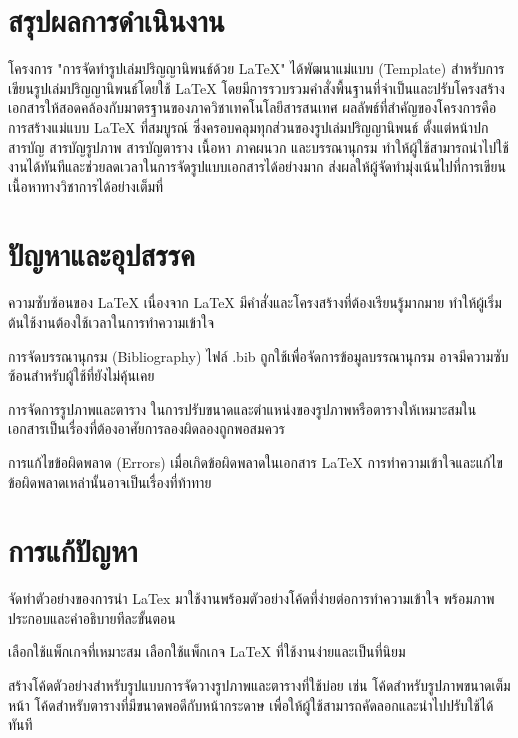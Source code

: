 
\section{สรุปผลการดำเนินงาน}
\hspace*{1.5em}
โครงการ "การจัดทำรูปเล่มปริญญานิพนธ์ด้วย LaTeX" ได้พัฒนาแม่แบบ (Template) สำหรับการเขียนรูปเล่มปริญญานิพนธ์โดยใช้ LaTeX โดยมีการรวบรวมคำสั่งพื้นฐานที่จำเป็นและปรับโครงสร้างเอกสารให้สอดคล้องกับมาตรฐานของภาควิชาเทคโนโลยีสารสนเทศ ผลลัพธ์ที่สำคัญของโครงการคือการสร้างแม่แบบ LaTeX ที่สมบูรณ์ ซึ่งครอบคลุมทุกส่วนของรูปเล่มปริญญานิพนธ์ ตั้งแต่หน้าปก สารบัญ สารบัญรูปภาพ สารบัญตาราง เนื้อหา ภาคผนวก และบรรณานุกรม ทำให้ผู้ใช้สามารถนำไปใช้งานได้ทันทีและช่วยลดเวลาในการจัดรูปแบบเอกสารได้อย่างมาก ส่งผลให้ผู้จัดทำมุ่งเน้นไปที่การเขียนเนื้อหาทางวิชาการได้อย่างเต็มที่

\section{ปัญหาและอุปสรรค}
\begin{mycustomenum}[label=5.2.\arabic*] 
    \item ความซับซ้อนของ LaTeX เนื่องจาก LaTeX มีคำสั่งและโครงสร้างที่ต้องเรียนรู้มากมาย ทำให้ผู้เริ่มต้นใช้งานต้องใช้เวลาในการทำความเข้าใจ
    \item การจัดบรรณานุกรม (Bibliography) ไฟล์ .bib ถูกใช้เพื่อจัดการข้อมูลบรรณานุกรม อาจมีความซับซ้อนสำหรับผู้ใช้ที่ยังไม่คุ้นเคย
    \item การจัดการรูปภาพและตาราง ในการปรับขนาดและตำแหน่งของรูปภาพหรือตารางให้เหมาะสมในเอกสารเป็นเรื่องที่ต้องอาศัยการลองผิดลองถูกพอสมควร
    \item การแก้ไขข้อผิดพลาด (Errors) เมื่อเกิดข้อผิดพลาดในเอกสาร LaTeX การทำความเข้าใจและแก้ไขข้อผิดพลาดเหล่านั้นอาจเป็นเรื่องที่ท้าทาย
\end{mycustomenum}

\section{การแก้ปัญหา}
\begin{mycustomenum}[label=5.3.\arabic*] 
    \item จัดทำตัวอย่างของการนำ LaTex มาใช้งานพร้อมตัวอย่างโค้ดที่ง่ายต่อการทำความเข้าใจ พร้อมภาพประกอบและคำอธิบายทีละขั้นตอน
    \item เลือกใช้แพ็กเกจที่เหมาะสม เลือกใช้แพ็กเกจ LaTeX ที่ใช้งานง่ายและเป็นที่นิยม 
    \item สร้างโค้ดตัวอย่างสำหรับรูปแบบการจัดวางรูปภาพและตารางที่ใช้บ่อย เช่น โค้ดสำหรับรูปภาพขนาดเต็มหน้า โค้ดสำหรับตารางที่มีขนาดพอดีกับหน้ากระดาษ เพื่อให้ผู้ใช้สามารถคัดลอกและนำไปปรับใช้ได้ทันที
\end{mycustomenum}

